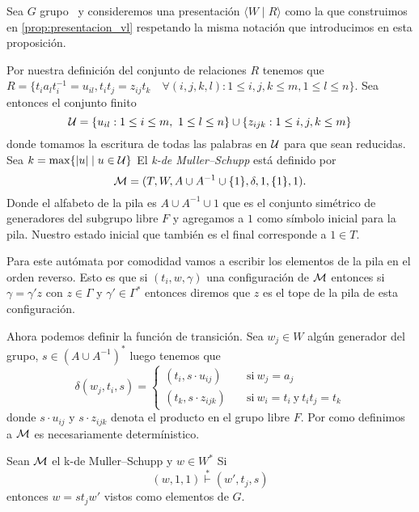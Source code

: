 \documentclass[tesis.tex]{subfiles}
\begin{document}
	Sea $G$ grupo \vl  \ y consideremos una presentación $\langle W  \mid  R \rangle$ como la que construimos en \ref{prop:presentacion_vl} respetando la misma notación que introducimos en esta proposición.
	
	Por nuestra definición del conjunto de relaciones $R$ tenemos que $R = \{t_ia_{l}t_i^{-1} = u_{il},  t_it_j = z_{ij}t_k \quad \forall (i,j,k,l) :   1 \le i,j,k \le m, 1 \le l  \le n \}$. 
	Sea entonces el conjunto finito 
	\[
	{\cal U} =  \{u_{il} : 1 \le i \le m, \ 1 \le l \le n \}  \cup  \{z_{ijk} : 1 \le i,j,k \le m\} 
	\]
	donde tomamos la escritura de todas las palabras en $\cal{U}$ para que sean reducidas.
	Sea $k = \max \{ |u| \mid u \in \cal U \}$ 
	El \emph{k-\APD de Muller--Schupp } está definido por 
	\[
	{\cal M }= (T, W , A \cup A^{-1} \cup \{ 1 \}, \delta, 1, \{1\}, 1).
	\]
	Donde el alfabeto de la pila es $A \cup A^{-1} \cup 1$ que es el conjunto simétrico de generadores del subgrupo libre $F$ y agregamos a $1$ como símbolo inicial para la pila.
	Nuestro estado inicial que también es el final corresponde a $1 \in T$.

	Para este autómata por comodidad vamos a escribir los elementos de la pila en el orden reverso. 
	Esto es que si $(t_{i},w,\gamma)$ una configuración de $\cal M$ entonces si $\gamma = \gamma' z$ con $z \in \Gamma$ y $\gamma' \in \Gamma^{*}$ entonces diremos que $z$ es el tope de la pila de esta configuración.


	Ahora podemos definir la función de transición. 
	Sea $w_{j} \in W$ algún generador del grupo, $s \in (A \cup A^{-1})^{*}$ luego tenemos que
	\[
	\delta(w_j,t_i, s) =
	\begin{cases}
		(t_{i}, s \cdot u_{ij}) \quad 
		&\text{si} \ w_{j}=a_{j} \\
		(t_{k}, s \cdot z_{ijk} ) \quad 
		&\text{si} \ w_{i}=t_{i} \ \text{y} \ t_{i}t_{j} = t_{k}
	\end{cases}\]
	donde $s \cdot u_{ij}$ y $s \cdot z_{ijk}$ denota el producto en el grupo libre $F$.
	Por como definimos a $\cal M$ es necesariamente determínistico.

	\begin{lema}\label{lema_MuSc_invariante}
		Sean $\cal M$ el k-\APD de Muller--Schupp y $w \in W^*$ 
		Si  
			\[
				(w,1, 1) \overset{*}{\vdash} (w', t_{j}, s)
			\]
		entonces $w = st_{j}w'$ vistos como elementos de $G$.
	\end{lema}
	
\end{document}
